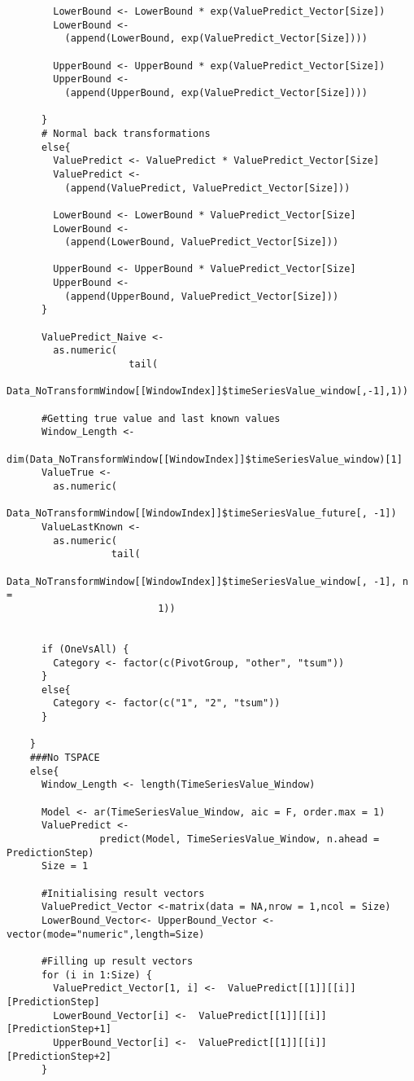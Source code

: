 \begin{verbatim}
        LowerBound <- LowerBound * exp(ValuePredict_Vector[Size])
        LowerBound <-
          (append(LowerBound, exp(ValuePredict_Vector[Size])))
        
        UpperBound <- UpperBound * exp(ValuePredict_Vector[Size])
        UpperBound <-
          (append(UpperBound, exp(ValuePredict_Vector[Size])))
        
      }
      # Normal back transformations
      else{
        ValuePredict <- ValuePredict * ValuePredict_Vector[Size]
        ValuePredict <-
          (append(ValuePredict, ValuePredict_Vector[Size]))
        
        LowerBound <- LowerBound * ValuePredict_Vector[Size]
        LowerBound <-
          (append(LowerBound, ValuePredict_Vector[Size]))
        
        UpperBound <- UpperBound * ValuePredict_Vector[Size]
        UpperBound <-
          (append(UpperBound, ValuePredict_Vector[Size]))
      }
      
      ValuePredict_Naive <-
        as.numeric(
					 tail(
						Data_NoTransformWindow[[WindowIndex]]$timeSeriesValue_window[,-1],1))
      
      #Getting true value and last known values
      Window_Length <-
        dim(Data_NoTransformWindow[[WindowIndex]]$timeSeriesValue_window)[1]
      ValueTrue <-
        as.numeric(
				   Data_NoTransformWindow[[WindowIndex]]$timeSeriesValue_future[, -1])
      ValueLastKnown <-
        as.numeric(
				  tail(
					 Data_NoTransformWindow[[WindowIndex]]$timeSeriesValue_window[, -1], n =
                          1))
      
      
      if (OneVsAll) {
        Category <- factor(c(PivotGroup, "other", "tsum"))
      }
      else{
        Category <- factor(c("1", "2", "tsum"))
      }
      
    }
    ###No TSPACE
    else{
      Window_Length <- length(TimeSeriesValue_Window)
      
      Model <- ar(TimeSeriesValue_Window, aic = F, order.max = 1)
      ValuePredict <- 
			    predict(Model, TimeSeriesValue_Window, n.ahead = PredictionStep)
      Size = 1
      
      #Initialising result vectors
      ValuePredict_Vector <-matrix(data = NA,nrow = 1,ncol = Size)
      LowerBound_Vector<- UpperBound_Vector <- vector(mode="numeric",length=Size)
      
      #Filling up result vectors
      for (i in 1:Size) {
        ValuePredict_Vector[1, i] <-  ValuePredict[[1]][[i]][PredictionStep]
        LowerBound_Vector[i] <-  ValuePredict[[1]][[i]][PredictionStep+1]
        UpperBound_Vector[i] <-  ValuePredict[[1]][[i]][PredictionStep+2]
      }
      

\end{verbatim}
